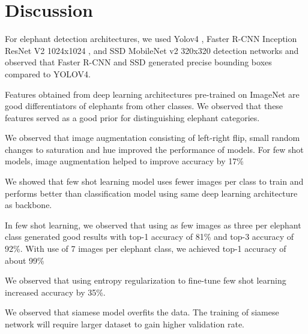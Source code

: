 \documentclass[10pt,twocolumn,letterpaper]{article}
\begin{document}

\section{Discussion}
\label{sec:discussion}

For elephant detection architectures, we used Yolov4 \cite{yolov4}, Faster R-CNN Inception ResNet V2 1024x1024 \cite{fasterrcnn}, and SSD MobileNet v2 320x320 detection networks and observed that Faster R-CNN and SSD generated precise bounding boxes compared to YOLOV4.

Features obtained from deep learning architectures pre-trained on ImageNet are good differentiators of elephants from other classes. We observed that these features served as a good prior for distinguishing elephant categories. 

We observed that image augmentation consisting of left-right flip, small random changes to saturation and hue improved the performance of models. For few shot models, image augmentation helped to improve accuracy by 17\%

We showed that few shot learning model uses fewer images per class to train and performs better than classification model using same deep learning architecture as backbone.

In few shot learning, we observed that using as few images as three per elephant class generated good results with top-1 accuracy of 81\% and top-3 accuracy of 92\%. With use of 7 images per elephant class, we achieved top-1 accuracy of about 99\%

We observed that using entropy regularization to fine-tune few shot learning increased accuracy by 35\%.

We observed that siamese model overfits the data. The training of siamese network will require larger dataset to gain higher validation rate. 


\end{document}
